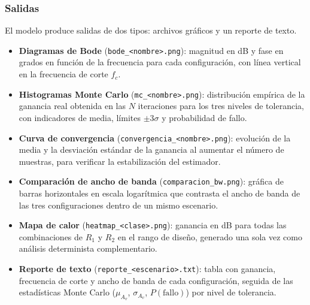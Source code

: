 ﻿\documentclass[12pt, letterpaper]{article}
\begin{document}
\subsubsection*{Salidas}

El modelo produce salidas de dos tipos: archivos gráficos y un reporte de texto.

\begin{itemize}[leftmargin=2em]

    \item \textbf{Diagramas de Bode} (\texttt{bode\_<nombre>.png}):
          magnitud en dB y fase en grados en función de la frecuencia para cada
          configuración, con línea vertical en la frecuencia de corte \(f_c\).

    \item \textbf{Histogramas Monte Carlo} (\texttt{mc\_<nombre>.png}):
          distribución empírica de la ganancia real obtenida en las \(N\)
          iteraciones para los tres niveles de tolerancia, con indicadores de
          media, límites \(\pm 3\sigma\) y probabilidad de fallo.

    \item \textbf{Curva de convergencia} (\texttt{convergencia\_<nombre>.png}):
          evolución de la media y la desviación estándar de la ganancia al
          aumentar el número de muestras, para verificar la estabilización del
          estimador.

    \item \textbf{Comparación de ancho de banda}
          (\texttt{comparacion\_bw.png}): gráfica de barras horizontales en
          escala logarítmica que contrasta el ancho de banda de las tres
          configuraciones dentro de un mismo escenario.

    \item \textbf{Mapa de calor} (\texttt{heatmap\_<clase>.png}):
          ganancia en dB para todas las combinaciones de \(R_1\) y \(R_2\)
          en el rango de diseño, generado una sola vez como análisis
          determinista complementario.

    \item \textbf{Reporte de texto} (\texttt{reporte\_<escenario>.txt}):
          tabla con ganancia, frecuencia de corte y ancho de banda de cada
          configuración, seguida de las estadísticas Monte Carlo
          (\(\mu_{A_v}\), \(\sigma_{A_v}\), \(P(\text{fallo})\)) por nivel de
          tolerancia.

\end{itemize}
\end{document}
